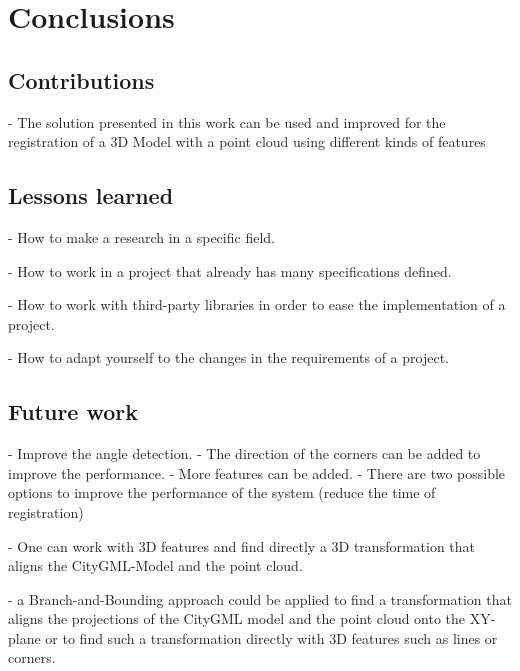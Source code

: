 

    \chapter{Conclusions}

    \section{Contributions}
    - The solution presented in this work can be used and improved for the registration of a 3D Model with a point cloud using different kinds of features 

    \section{Lessons learned}
    - How to make a research in a specific field. \par
    - How to work in a project that already has many specifications defined. \par
    - How to work with third-party libraries in order to ease the implementation of a project. \par
    - How to adapt yourself to the changes in the requirements of a project. \par
    

    \section{Future work}
    - Improve the angle detection.
    - The direction of the corners can be added to improve the performance.
    - More features can be added.
    - There are two possible options to improve the performance of the system (reduce the time of registration) \par
    - One can work with 3D features and find directly a 3D transformation that aligns the CityGML-Model and the point cloud. \par
    - a Branch-and-Bounding \cite{Bazin_2013_abranchandbound,Breuel_2003_implementation,Brown_2015_globally,Brown_2019_afamily} approach could be applied 
    to find a transformation that aligns the projections of the CityGML model and the point cloud onto the XY-plane or to find such a transformation directly
    with 3D features such as lines or corners. \par

